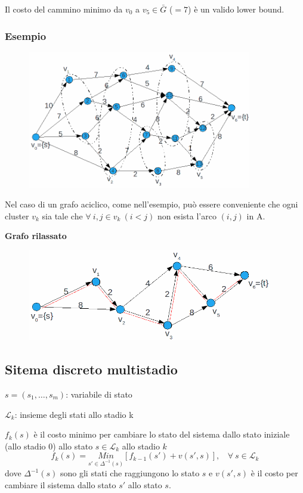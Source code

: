Il costo del cammino minimo da $v_{0}$ a $v_{5}\in\bar{G}$ ($ =7$) è un valido lower bound.

\subsubsection{Esempio}
\begin{figure}[!h]
	\centering
	\includegraphics[height=6cm]{images/graph44.png}
\end{figure}
Nel caso di un grafo aciclico, come nell'esempio, può essere conveniente che ogni cluster $v_{k}$ sia tale che $\forall\ i,j\in v_{k}\ (i<j)$ non esista l'arco $(i,j)$ in A.

\textbf{Grafo rilassato}\\
\begin{figure}[H]
	\centering
	\includegraphics[height=4cm]{images/graph45.png}
\end{figure}

\subsection{Sitema discreto multistadio}
$s=(s_{1},\dots,s_{m})$: variabile di stato

$\mathscr{L}_{k}$: insieme degli stati allo stadio k

$f_{k}(s)$ è il costo minimo per cambiare lo stato del sistema dallo stato iniziale (allo stadio $0$) allo stato $s\in\mathscr{L}_{k}$ allo stadio $k$
\begin{equation*}
	f_{k}(s)=\underset{s'\in\Delta^{-1}(s)}{Min}[f_{k-1}(s')+v(s',s)],\ \ \ \ \forall\ s\in\mathscr{L}_{k}
\end{equation*}
dove $\Delta^{-1}(s)$ sono gli stati che raggiungono lo stato $s$ e $v(s',s)$ è il costo per cambiare il sistema dallo stato $s'$ allo stato $s$.

